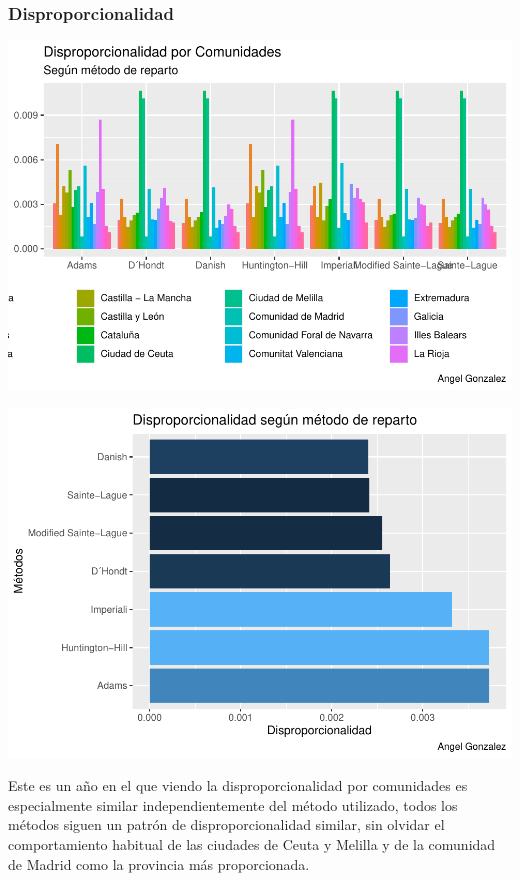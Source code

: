 \documentclass[12pt,a4paper,]{book}
\numberwithin{dummy}{section}
\theoremstyle{ocrenumbox}
\theoremstyle{blacknumex}
\theoremstyle{blacknumbox}
\theoremstyle{ocrenum}
\theoremstyle{ocrenum}
\begin{document}
\hypertarget{disproporcionalidad-12}{%
\subsubsection{Disproporcionalidad}\label{disproporcionalidad-12}}

\begin{center}\includegraphics[width=0.95\linewidth]{figurasR/unnamed-chunk-129-1} \end{center}

\begin{center}\includegraphics[width=0.95\linewidth]{figurasR/unnamed-chunk-129-2} \end{center}

Este es un año en el que viendo la disproporcionalidad por comunidades
es especialmente similar independientemente del método utilizado, todos
los métodos siguen un patrón de disproporcionalidad similar, sin olvidar
el comportamiento habitual de las ciudades de Ceuta y Melilla y de la
comunidad de Madrid como la provincia más proporcionada.
\end{document}
